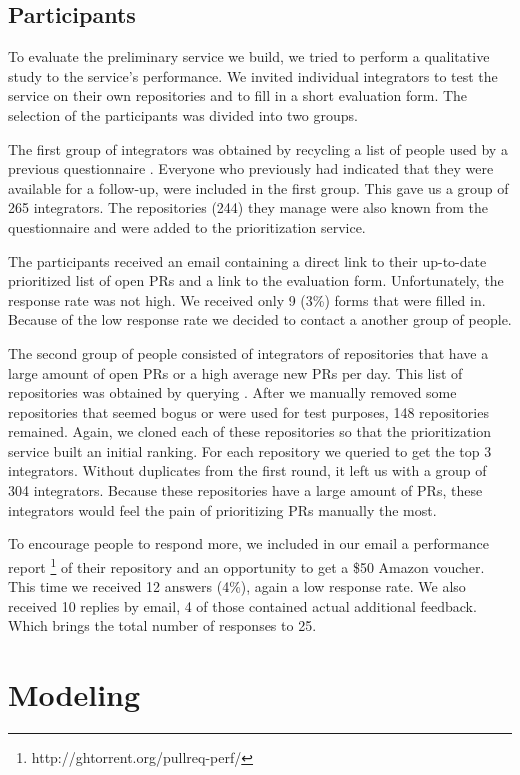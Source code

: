 \documentclass[conference]{IEEEtran}
\begin{document}
\subsection{Participants}
To evaluate the preliminary service we build, we tried to perform a qualitative study to the service's performance.
We invited individual integrators to test the service on their own repositories and to fill in a short evaluation form.
The selection of the participants was divided into two groups.

The first group of integrators was obtained by recycling a list of people used by a previous questionnaire \cite{GZSD15}.
Everyone who previously had indicated that they were available for a follow-up, were included in the first group.
This gave us a group of 265 integrators.
The repositories (244) they manage were also known from the questionnaire and were added to the prioritization service.

The participants received an email containing a direct link to their up-to-date prioritized list of open PRs and a link to the evaluation form.
Unfortunately, the response rate was not high.
We received only 9 (3\%) forms that were filled in.
Because of the low response rate we decided to contact a another group of people.

The second group of people consisted of integrators of repositories that have a large amount of open PRs or a high average new PRs per day.
This list of repositories was obtained by querying \ghtorrent.
After we manually removed some repositories that seemed bogus or were used for test purposes, 148 repositories remained.
Again, we cloned each of these repositories so that the prioritization service built an initial ranking.
For each repository we queried \ghtorrent to get the top 3 integrators.
Without duplicates from the first round, it left us with a group of 304 integrators.
Because these repositories have a large amount of PRs, these integrators would feel the pain of prioritizing PRs manually the most.

To encourage people to respond more, we included in our email a performance report \footnote{http://ghtorrent.org/pullreq-perf/} of their repository and an opportunity to get a \$50 Amazon voucher.
This time we received 12 answers (4\%), again a low response rate.
We also received 10 replies by email, 4 of those contained actual additional feedback.
Which brings the total number of responses to 25.


\section{Modeling}
\label{sec:modeling}
\end{document}
